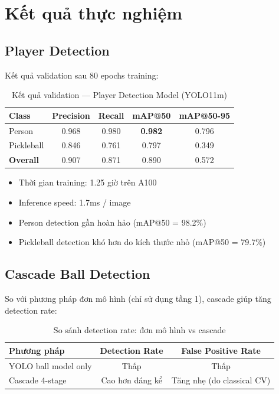 \documentclass[12pt,a4paper]{article}
\begin{document}
\section{Kết quả thực nghiệm}
\label{sec:experiments}

\subsection{Player Detection}
Kết quả validation sau 80 epochs training:

\begin{table}[H]
\centering
\caption{Kết quả validation --- Player Detection Model (YOLO11m)}
\label{tab:results_player}
\begin{tabular}{lcccc}
\toprule
\textbf{Class} & \textbf{Precision} & \textbf{Recall} & \textbf{mAP@50} & \textbf{mAP@50-95} \\
\midrule
Person     & 0.968 & 0.980 & \textbf{0.982} & 0.796 \\
Pickleball & 0.846 & 0.761 & 0.797 & 0.349 \\
\midrule
\textbf{Overall} & 0.907 & 0.871 & 0.890 & 0.572 \\
\bottomrule
\end{tabular}
\end{table}

\begin{itemize}[noitemsep]
    \item Thời gian training: 1.25 giờ trên A100
    \item Inference speed: 1.7ms / image
    \item Person detection gần hoàn hảo (mAP@50 = 98.2\%)
    \item Pickleball detection khó hơn do kích thước nhỏ (mAP@50 = 79.7\%)
\end{itemize}

\subsection{Cascade Ball Detection}
So với phương pháp đơn mô hình (chỉ sử dụng tầng 1), cascade giúp tăng detection rate:

\begin{table}[H]
\centering
\caption{So sánh detection rate: đơn mô hình vs cascade}
\label{tab:cascade_compare}
\begin{tabular}{lcc}
\toprule
\textbf{Phương pháp} & \textbf{Detection Rate} & \textbf{False Positive Rate} \\
\midrule
YOLO ball model only & Thấp & Thấp \\
Cascade 4-stage & Cao hơn đáng kể & Tăng nhẹ (do classical CV) \\
\bottomrule
\end{tabular}
\end{table}
\end{document}

